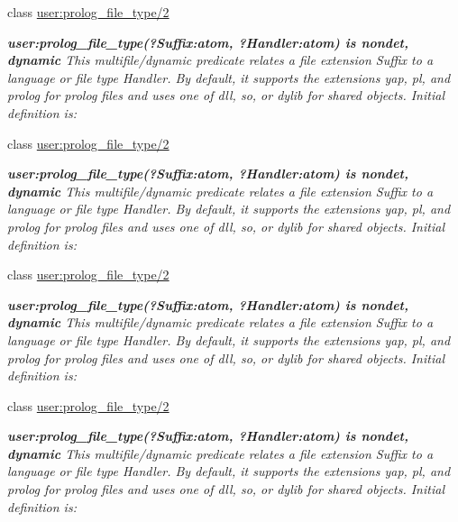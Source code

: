 \begin{DoxyCompactItemize}
class \hyperlink{classuser_1_1prolog__file__type_22}{user\+:prolog\+\_\+file\+\_\+type/2}
\begin{DoxyCompactList}\small\item\em {\bfseries  user\+:prolog\+\_\+file\+\_\+type(?Suffix\+:atom, ?Handler\+:atom) is nondet, dynamic } This multifile/dynamic predicate relates a file extension {\itshape Suffix} to a language or file type {\itshape Handler}. By default, it supports the extensions yap, pl, and prolog for prolog files and uses one of dll, so, or dylib for shared objects. Initial definition is\+: \end{DoxyCompactList}\item 
class \hyperlink{classuser_1_1prolog__file__type_22}{user\+:prolog\+\_\+file\+\_\+type/2}
\begin{DoxyCompactList}\small\item\em {\bfseries  user\+:prolog\+\_\+file\+\_\+type(?Suffix\+:atom, ?Handler\+:atom) is nondet, dynamic } This multifile/dynamic predicate relates a file extension {\itshape Suffix} to a language or file type {\itshape Handler}. By default, it supports the extensions yap, pl, and prolog for prolog files and uses one of dll, so, or dylib for shared objects. Initial definition is\+: \end{DoxyCompactList}\item 
class \hyperlink{classuser_1_1prolog__file__type_22}{user\+:prolog\+\_\+file\+\_\+type/2}
\begin{DoxyCompactList}\small\item\em {\bfseries  user\+:prolog\+\_\+file\+\_\+type(?Suffix\+:atom, ?Handler\+:atom) is nondet, dynamic } This multifile/dynamic predicate relates a file extension {\itshape Suffix} to a language or file type {\itshape Handler}. By default, it supports the extensions yap, pl, and prolog for prolog files and uses one of dll, so, or dylib for shared objects. Initial definition is\+: \end{DoxyCompactList}\item 
class \hyperlink{classuser_1_1prolog__file__type_22}{user\+:prolog\+\_\+file\+\_\+type/2}
\begin{DoxyCompactList}\small\item\em {\bfseries  user\+:prolog\+\_\+file\+\_\+type(?Suffix\+:atom, ?Handler\+:atom) is nondet, dynamic } This multifile/dynamic predicate relates a file extension {\itshape Suffix} to a language or file type {\itshape Handler}. By default, it supports the extensions yap, pl, and prolog for prolog files and uses one of dll, so, or dylib for shared objects. Initial definition is\+: \end{DoxyCompactList}\item 

\end{DoxyCompactItemize}
